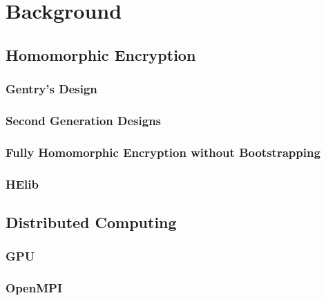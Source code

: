 \chapter{Background}
\section{Homomorphic Encryption}
\subsection{Gentry's Design}
\subsection{Second Generation Designs}
\subsection{Fully Homomorphic Encryption without Bootstrapping}
\subsection{HElib}
\section{Distributed Computing}
\subsection{GPU}
\subsection{OpenMPI}